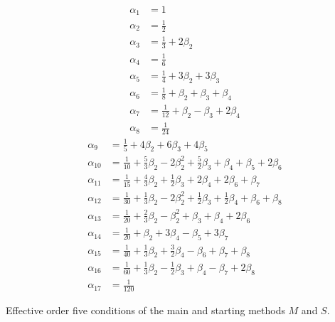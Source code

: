 \begin{table}
	\begin{multicols}{2}
		\begin{align*}
    		\alpha_1  &= 1 \\
     		\alpha_2  &= \tfrac{1}{2} \\
    		\alpha_3  &= \tfrac{1}{3} + 2\beta_2 \\
    		\alpha_4  &= \tfrac{1}{6} \\
    		\alpha_5  &= \tfrac{1}{4} + 3\beta_2 + 3\beta_3 \\
    		\alpha_6  &= \tfrac{1}{8} + \beta_2 + \beta_3 + \beta_4 \\
    		\alpha_7  &= \tfrac{1}{12} +\beta_2 - \beta_3 + 2\beta_4 \\
    		\alpha_8  &= \tfrac{1}{24}
    	\end{align*}
    	\vfill
    	\columnbreak
    	\begin{align*}
    		\alpha_9  &= \tfrac{1}{5} + 4\beta_2 + 6\beta_3 + 4\beta_5 \\
    		\alpha_{10} &= \tfrac{1}{10} + \tfrac{5}{3}\beta_2 - 2\beta_2^{2} + \tfrac{5}{2}\beta_3 + \beta_4 + \beta_5 + 2\beta_6 \\
    		\alpha_{11} &= \tfrac{1}{15} + \tfrac{4}{3}\beta_2 + \tfrac{1}{2}\beta_3 + 2\beta_4 + 2\beta_6 + \beta_7 \\
    		\alpha_{12} &= \tfrac{1}{30} + \tfrac{1}{3}\beta_2 - 2\beta_2^{2} + \tfrac{1}{2}\beta_3 + \tfrac{1}{2}\beta_4 + \beta_6 + \beta_8 \\
    		\alpha_{13} &= \tfrac{1}{20} + \tfrac{2}{3}\beta_2 - \beta_2^{2} + \beta_3 + \beta_4 + 2\beta_6 \\
    		\alpha_{14} &= \tfrac{1}{20} + \beta_2 + 3\beta_4 - \beta_5 + 3\beta_7 \\
    		\alpha_{15} &= \tfrac{1}{40} + \tfrac{1}{3}\beta_2 + \tfrac{3}{2}\beta_4 - \beta_6 + \beta_7 + \beta_8 \\
    		\alpha_{16} &= \tfrac{1}{60} + \tfrac{1}{3}\beta_2 - \tfrac{1}{2}\beta_3 + \beta_4 - \beta_7 + 2\beta_8 \\
    		\alpha_{17} &= \tfrac{1}{120}
    	\end{align*}%
    \end{multicols}
    \caption{Effective order five conditions of the main and starting methods $M$ and $S$.}
    \label{tab:effective_OCs_on_alpha}
\end{table}


